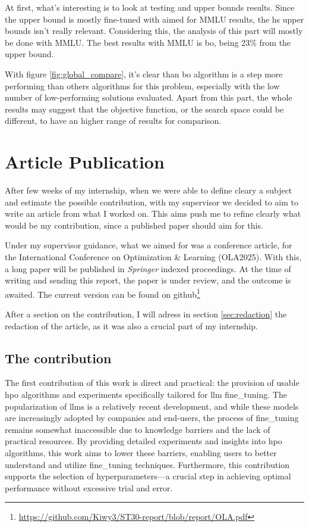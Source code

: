 At first, what's interesting is to look at testing and upper bounds results. Since the upper bound is mostly fine-tuned with aimed for MMLU results, the \Gls{hs} upper bounds isn't really relevant. Considering this, the analysis of this part will mostly be done with MMLU. The best results with MMLU is \acrfull{bo}, being 23\% from the upper bound.




With figure \ref{fig:global_compare}, it's clear than \acrshort{bo} algorithm is a step more performing than others algorithms for this problem, especially with the low number of low-performing solutions evaluated. Apart from this part, the whole results may suggest that the objective function, or the search space could be different, to have an higher range of results for comparison. 


\section{Article Publication}
\label{sec:article}

After few weeks of my internship, when we were able to define cleary a subject and estimate the possible contribution, with my supervisor we decided to aim to write an article from what I worked on. This aims push me to refine clearly what would be my contribution, since a published paper should aim for this. 

Under my supervisor guidance, what we aimed for was a conference article, for the International Conference on Optimization \& Learning (OLA2025). With this, a long paper will be published in \textit{Springer} indexed proceedings. At the time of writing and sending this report, the paper is under review, and the outcome is awaited. The current version can be found on github\footnote{\url{https://github.com/Kiwy3/ST30-report/blob/report/OLA.pdf}}

After a section on the contribution, I will adress in section \ref{sec:redaction} the redaction of the article, as it was also a crucial part of my internship.

\subsection{The contribution}
\label{sec:contribution}
The first contribution of this work is direct and practical: the provision of usable \acrshort{hpo} algorithms and experiments specifically tailored for \acrshort{llm} \gls{fine_tuning}. The popularization of \acrshort{llm}s is a relatively recent development, and while these models are increasingly adopted by companies and end-users, the process of \gls{fine_tuning} remains somewhat inaccessible due to knowledge barriers and the lack of practical resources. By providing detailed experiments and insights into \acrshort{hpo} algorithms, this work aims to lower these barriers, enabling users to better understand and utilize \gls{fine_tuning} techniques. Furthermore, this contribution supports the selection of \glspl{hyperparameter}—a crucial step in achieving optimal performance without excessive trial and error.

